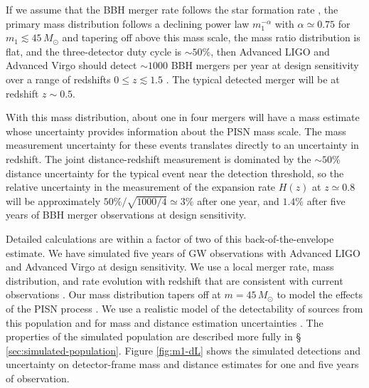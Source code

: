 \documentclass[modern]{aastex62}
\newcommand{\MPISN}{45 \, \MSun{}}
\newcommand{\zpivot}{0.8}
\newcommand{\MSun}{M_\odot}
\begin{document}
If we assume that the \ac{BBH} merger rate follows the star formation rate
\citep{Fishbach2018,O1O2Population}, the primary mass distribution follows a
declining power law $m_1^{-\alpha}$ with $\alpha \simeq 0.75$ for $m_1 \lesssim
\MPISN{}$ and tapering off above this mass scale, the mass ratio distribution is
flat, and the three-detector duty cycle is $\sim 50\%$, then Advanced LIGO and
Advanced Virgo should detect $\sim 1000$ \ac{BBH} mergers per year at design
sensitivity over a range of redshifts $0 \leq z \lesssim 1.5$
\citep{O1O2Population}.  The typical detected merger will be at redshift $z
\sim 0.5$.

With this mass distribution, about one in four mergers will have a mass estimate
whose uncertainty provides information about the \ac{PISN} mass scale.  The mass
measurement uncertainty for these events translates directly to an uncertainty
in redshift.  The joint distance-redshift measurement is dominated by the $\sim
50\%$ distance uncertainty for the typical event near the detection threshold,
so the relative uncertainty in the measurement of the expansion rate $H(z)$ at
$z \simeq \zpivot{}$ will be approximately $50 \% / \sqrt{1000/4} \simeq 3 \%$
after one year, and $1.4 \%$ after five years of \ac{BBH} merger observations at
design sensitivity.

Detailed calculations are within a factor of two of this back-of-the-envelope
estimate.  We have simulated five years of \ac{GW} observations with Advanced
LIGO and Advanced Virgo at design sensitivity.  We use a local merger rate, mass
distribution, and rate evolution with redshift that are consistent with current
observations \citep{Fishbach2017,Fishbach2018,O1O2Population}.  Our mass
distribution tapers off at $m = \MPISN{}$ to model the effects of the \ac{PISN}
process \citep{Belczynski2016}.  We use a realistic model of the detectability
of sources from this population \citep{GW150914Rate,GW150914RateSupplement} and
for mass and distance estimation uncertainties \citep{Vitale2017}.  The
properties of the simulated population are described more fully in \S
\ref{sec:simulated-population}.  Figure \ref{fig:m1-dL} shows the simulated
detections and uncertainty on detector-frame mass and distance estimates for one
and five years of observation.
\end{document}
